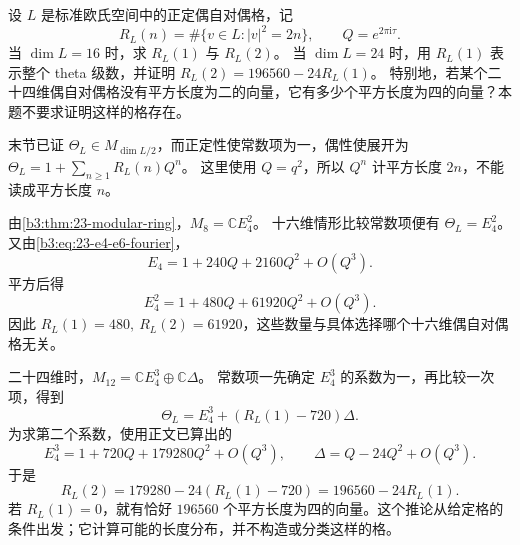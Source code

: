 \begin{optionalexercise}\label{b3:ex:24-8}
设 \(L\) 是标准欧氏空间中的正定偶自对偶格，记
\[
R_L(n)=\#\{v\in L:|v|^2=2n\},\qquad
Q=e^{2\pi\mathrm{i}\tau}.
\]
当 \(\dim L=16\) 时，求 \(R_L(1)\) 与 \(R_L(2)\)。
当 \(\dim L=24\) 时，用 \(R_L(1)\) 表示整个 theta 级数，并证明
\(R_L(2)=196560-24R_L(1)\)。
特别地，若某个二十四维偶自对偶格没有平方长度为二的向量，它有多少个平方长度为四的向量？本题不要求证明这样的格存在。
\end{optionalexercise}
\begin{solution}
末节已证 \(\Theta_L\in M_{\dim L/2}\)，而正定性使常数项为一，偶性使展开为
\(\Theta_L=1+\sum_{n\ge1}R_L(n)Q^n\)。
这里使用 \(Q=q^2\)，所以 \(Q^n\) 计平方长度 \(2n\)，不能读成平方长度 \(n\)。

由\cref{b3:thm:23-modular-ring}，\(M_8=\mathbb C E_4^2\)。
十六维情形比较常数项便有 \(\Theta_L=E_4^2\)。
又由\eqref{b3:eq:23-e4-e6-fourier}，
\[
E_4=1+240Q+2160Q^2+O(Q^3).
\]
平方后得
\[
E_4^2=1+480Q+61920Q^2+O(Q^3).
\]
因此 \(R_L(1)=480,\ R_L(2)=61920\)，这些数量与具体选择哪个十六维偶自对偶格无关。

二十四维时，\(M_{12}=\mathbb C E_4^3\oplus\mathbb C\Delta\)。
常数项一先确定 \(E_4^3\) 的系数为一，再比较一次项，得到
\[
\Theta_L=E_4^3+(R_L(1)-720)\Delta.
\]
为求第二个系数，使用正文已算出的
\[
E_4^3=1+720Q+179280Q^2+O(Q^3),\qquad
\Delta=Q-24Q^2+O(Q^3).
\]
于是
\[
R_L(2)=179280-24(R_L(1)-720)
       =196560-24R_L(1).
\]
若 \(R_L(1)=0\)，就有恰好 \(196560\) 个平方长度为四的向量。这个推论从给定格的条件出发；它计算可能的长度分布，并不构造或分类这样的格。
\end{solution}
